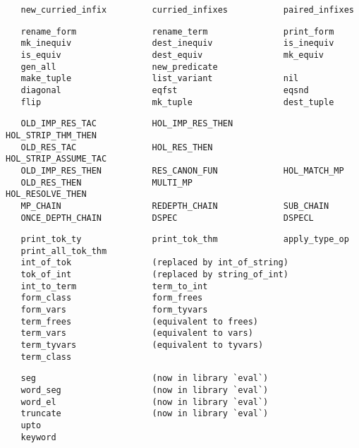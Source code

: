 \begin{hol}\begin{verbatim}
   new_curried_infix         curried_infixes           paired_infixes
\end{verbatim}\end{hol}
\begin{hol}\begin{verbatim}
   rename_form               rename_term               print_form
   mk_inequiv                dest_inequiv              is_inequiv
   is_equiv                  dest_equiv                mk_equiv
   gen_all                   new_predicate
   make_tuple                list_variant              nil
   diagonal                  eqfst                     eqsnd
   flip                      mk_tuple                  dest_tuple
\end{verbatim}\end{hol}
\begin{hol}\begin{verbatim}
   OLD_IMP_RES_TAC           HOL_IMP_RES_THEN          HOL_STRIP_THM_THEN
   OLD_RES_TAC               HOL_RES_THEN              HOL_STRIP_ASSUME_TAC
   OLD_IMP_RES_THEN          RES_CANON_FUN             HOL_MATCH_MP
   OLD_RES_THEN              MULTI_MP                  HOL_RESOLVE_THEN
   MP_CHAIN                  REDEPTH_CHAIN             SUB_CHAIN
   ONCE_DEPTH_CHAIN          DSPEC                     DSPECL
\end{verbatim}\end{hol}
\begin{hol}\begin{verbatim}
   print_tok_ty              print_tok_thm             apply_type_op
   print_all_tok_thm
   int_of_tok                (replaced by int_of_string)
   tok_of_int                (replaced by string_of_int)
   int_to_term               term_to_int
   form_class                form_frees
   form_vars                 form_tyvars
   term_frees                (equivalent to frees)
   term_vars                 (equivalent to vars)
   term_tyvars               (equivalent to tyvars)
   term_class            
\end{verbatim}\end{hol}
\begin{hol}\begin{verbatim}
   seg                       (now in library `eval`)
   word_seg                  (now in library `eval`)
   word_el                   (now in library `eval`)
   truncate                  (now in library `eval`)
   upto
   keyword
\end{verbatim}\end{hol}
